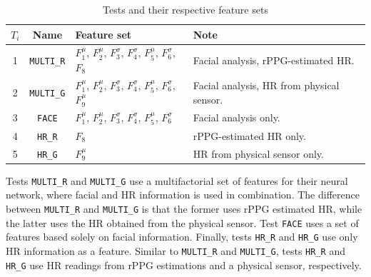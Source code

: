 \begin{table}
    \centering
    \caption{Tests and their respective feature sets}
    \label{table:study5-different-feature-sets}
    \begin{tabular}[l]{@{}cclp{4.0cm}}
        \toprule%
            \textbf{$T_i$} & \textbf{Name} & \textbf{Feature set} & \textbf{Note} \\
        \midrule%
            1 & \texttt{MULTI\_R} & $F_1^\mu$, $F_2^\mu$, $F_3^\sigma$, $F_4^\sigma$, $F_5^\mu$, $F_6^\sigma$, $F_8$ & Facial analysis, rPPG-estimated HR.\\ %
            2 & \texttt{MULTI\_G} & $F_1^\mu$, $F_2^\mu$, $F_3^\sigma$, $F_4^\sigma$, $F_5^\mu$, $F_6^\sigma$, $F_9^\mu$ & Facial analysis, HR from physical sensor.\\ %
            3 & \texttt{FACE} & $F_1^\mu$, $F_2^\mu$, $F_3^\sigma$, $F_4^\sigma$, $F_5^\mu$, $F_6^\sigma$ & Facial analysis only. \\ %
            4 & \texttt{HR\_R} & $F_8$ & rPPG-estimated HR only.\\ %
            5 & \texttt{HR\_G} & $F_9^\mu$ & HR from physical sensor only. \\ %
        \bottomrule%
    \end{tabular}
\end{table}

Tests \texttt{MULTI\_R} and \texttt{MULTI\_G} use a multifactorial set of features for their neural network, where facial and HR information is used in combination. The difference between \texttt{MULTI\_R} and \texttt{MULTI\_G} is that the former uses rPPG estimated HR, while the latter uses the HR obtained from the physical sensor. Test \texttt{FACE} uses a set of features based solely on facial information. Finally, tests \texttt{HR\_R} and \texttt{HR\_G} use only HR information as a feature. Similar to \texttt{MULTI\_R} and \texttt{MULTI\_G}, tests \texttt{HR\_R} and \texttt{HR\_G} use HR readings from rPPG estimations and a physical sensor, respectively.

